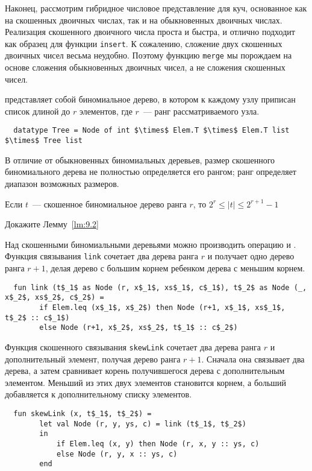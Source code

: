 \begin{frame}[fragile]{}



Наконец, рассмотрим гибридное числовое представление для куч,
основанное как на скошенных двоичных числах, так и на обыкновенных
двоичных числах. Реализация скошенного двоичного числа проста и
быстра, и отлично подходит как образец для функции
\lstinline!insert!. К сожалению, сложение двух скошенных двоичных
чисел весьма неудобно. Поэтому функцию \lstinline!merge! мы порождаем
на основе сложения обыкновенных двоичных чисел, а не сложения
скошенных чисел.

 представляет
собой биномиальное дерево, в котором к каждому узлу приписан список
длиной до $r$ элементов, где $r$~--- ранг рассматриваемого узла.
\begin{lstlisting}
  datatype Tree = Node of int $\times$ Elem.T $\times$ Elem.T list $\times$ Tree list
\end{lstlisting}
В отличие от обыкновенных биномиальных деревьев, размер скошенного
биномиального дерева не полностью определяется его рангом; ранг
определяет диапазон возможных размеров.

\begin{lemma}
  \label{lm:9.2}
  Если $t$~--- скошенное биномиальное дерево ранга $r$, то $2^r \le
  |t| \le 2^{r+1} - 1$
  \begin{exercise}\label{ex:9.15}
    Докажите Лемму~\ref{lm:9.2}
  \end{exercise}
\end{lemma}

Над скошенными биномиальными деревьями можно производить операцию
 и .
Функция связывания \lstinline!link! сочетает два дерева ранга $r$ и
получает одно дерево ранга $r+1$, делая дерево с большим корнем
ребенком дерева с меньшим корнем.
\begin{lstlisting}
  fun link (t$_1$ as Node (r, x$_1$, xs$_1$, c$_1$), t$_2$ as Node (_, x$_2$, xs$_2$, c$_2$) =
        if Elem.leq (x$_1$, x$_2$) then Node (r+1, x$_1$, xs$_1$, t$_2$ :: c$_1$)
        else Node (r+1, x$_2$, xs$_2$, t$_1$ :: c$_2$)
\end{lstlisting}
Функция скошенного связывания \lstinline!skewLink! сочетает два дерева
ранга $r$ и дополнительный элемент, получая дерево ранга
$r+1$. Сначала она связывает два дерева, а затем сравнивает корень
получившегося дерева с дополнительным элементом. Меньший из этих двух
элементов становится корнем, а больший добавляется к дополнительному
списку элементов.
\begin{lstlisting}
  fun skewLink (x, t$_1$, t$_2$) =
        let val Node (r, y, ys, c) = link (t$_1$, t$_2$)
        in
            if Elem.leq (x, y) then Node (r, x, y :: ys, c)
            else Node (r, y, x :: ys, c)
        end
\end{lstlisting}


\end{frame}
